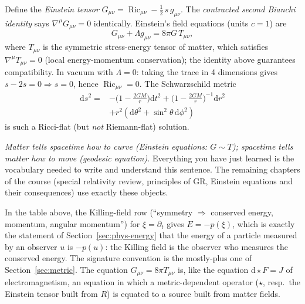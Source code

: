 \documentclass[11pt,a4paper]{article}
\numberwithin{equation}{section}
\theoremstyle{definition}
\theoremstyle{plain}
\newcommand{\dd}{\mathrm{d}}
\newcommand{\Ric}{\operatorname{Ric}}
\newcommand{\hodge}{\star}
\begin{document}
\begin{formal}
Define the \emph{Einstein tensor} $G_{\mu\nu}=\Ric_{\mu\nu}-\tfrac12\,s\,g_{\mu\nu}$. The \emph{contracted second Bianchi identity} says $\nabla^\mu G_{\mu\nu}=0$ identically. Einstein's field equations (units $c=1$) are
\[
G_{\mu\nu}+\Lambda g_{\mu\nu}=8\pi G\,T_{\mu\nu},
\]
where $T_{\mu\nu}$ is the symmetric stress-energy tensor of matter, which satisfies $\nabla^\mu T_{\mu\nu}=0$ (local energy-momentum conservation); the identity above guarantees compatibility. In vacuum with $\Lambda=0$: taking the trace in 4 dimensions gives $s-2s=0\Rightarrow s=0$, hence $\Ric_{\mu\nu}=0$. The Schwarzschild metric
\[
\begin{aligned}\dd s^2={}&-\Big(1-\tfrac{2GM}{r}\Big)\dd t^2+\Big(1-\tfrac{2GM}{r}\Big)^{-1}\dd r^2\\&+r^2(\dd\theta^2+\sin^2\theta\,\dd\phi^2)\end{aligned}
\]
is such a Ricci-flat (but \emph{not} Riemann-flat) solution.
\end{formal}
\begin{intuition}
\emph{Matter tells spacetime how to curve (Einstein equations: $G\sim T$); spacetime tells matter how to move (geodesic equation).} Everything you have just learned is the vocabulary needed to write and understand this sentence. The remaining chapters of the course (special relativity review, principles of GR, Einstein equations and their consequences) use exactly these objects.
\end{intuition}


\begin{synthesis}
In the table above, the Killing-field row (``symmetry $\Rightarrow$ conserved energy, momentum, angular momentum'') for $\xi=\partial_t$ gives $E=-p(\xi)$, which is exactly the statement of Section~\ref{sec:phys-energy} that the energy of a particle measured by an observer $u$ is $-p(u)$: the Killing field is the observer who measures the conserved energy.
The signature convention is the mostly-plus one of Section~\ref{sec:metric}. The equation $G_{\mu\nu}=8\pi T_{\mu\nu}$ is, like the equation $\dd\hodge F=J$ of electromagnetism, an equation in which a metric-dependent operator ($\hodge$, resp.\ the Einstein tensor built from $R$) is equated to a source built from matter fields.
\end{synthesis}


\clearpage
\end{document}
